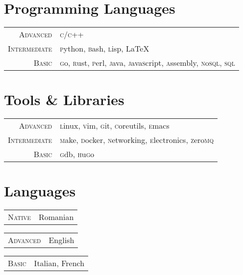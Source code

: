 \documentclass[a4paper,12pt]{article}
\begin{document}
\section{Programming Languages}
\begin{tabular}{rl}
  \textsc{Advanced}&
    \textsc{c/c++}\\
  \textsc{Intermediate}&
    \textsc{p}ython, \textsc{b}ash,
    \textsc{l}isp, \LaTeX\\
  \textsc{Basic}&
    \textsc{g}o, \textsc{r}ust,
    \textsc{p}erl, \textsc{j}ava, 
    \textsc{j}ava\textsc{s}cript,
    \textsc{a}ssembly, \textsc{n}o\textsc{sql}, 
    \textsc{sql}\\
\end{tabular}

\section{Tools \& Libraries}
\begin{tabular}{rl}
  \textsc{Advanced}&
    \textsc{l}inux, \textsc{v}im, \textsc{g}it,
    \textsc{c}oreutils, \textsc{e}macs\\
  \textsc{Intermediate}&
     \textsc{m}ake, \textsc{d}ocker, \textsc{n}etworking,  
    \textsc{e}lectronics, \textsc{z}ero\textsc{mq}\\ 
  \textsc{Basic}&
    \textsc{g}db, \textsc{h}u\textsc{g}o \\ 
\end{tabular}



\section{Languages}
\begin{multicols}{3}
  \begin{tabular}{rl}
    \textsc{Native}&Romanian\\
  \end{tabular}
  \columnbreak

  \begin{tabular}{rl}
    \textsc{Advanced}&English\\
  \end{tabular}
  \columnbreak

  \begin{tabular}{rl}
    \textsc{Basic}&Italian, French\\
  \end{tabular}
\end{multicols}
\end{document}
